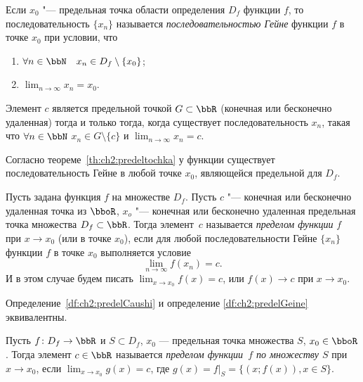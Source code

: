 \begin{defn}
Если $x_0$ "--- предельная точка области определения $D_f$ функции $f$, то последовательность $\{x_n\}$ называется \textit{последовательностью Гейне} функции $f$ в точке $x_0$ при условии, что
\begin{enumerate}
\item $\forall n \in \bbN\quad x_n\in D_f\setminus \{x_0\}$;
\item $\lim_{n \to \infty}\limits x_n = x_0$.
\end{enumerate}
\end{defn}

\begin{thm}
\label{th:ch2:predeltochka}
Элемент $c$ является предельной точкой $G\subset \bbR$ (конечная или бесконечно удаленная) тогда и только тогда, когда существует последовательность ${x_n}$, такая что $\forall n \in \bbN$ $x_n \in G\setminus\{c\}$ и $\lim_{n \to \infty}\limits x_n = c$. 
\end{thm}

Согласно теореме~\ref{th:ch2:predeltochka} у функции существует последовательность Гейне в любой точке $x_0$, являющейся предельной для $D_f$.

\begin{defn}\label{df:ch2:predelGeine}
Пусть задана функция $f$ на множестве $D_f$. Пусть $c$ "--- конечная или бесконечно удаленная точка из $\bboR$, $x_o$ "--- конечная или бесконечно удаленная предельная точка  множества $D_f \subset \bbR$. Тогда элемент~$c$ называется \textit{пределом функции} $f$ при $x \to x_0$ (или в точке $x_0$), если для любой последовательности Гейне $\{x_n\}$ функции $f$ в точке $x_0$ выполняется условие 
$$\lim_{n \to \infty}\limits f(x_n) = c.$$ 
И в этом случае будем писать $\lim_{x \to x_0}\limits f(x) = c$, или $f(x)\to c$ при $x \to x_0$.
\end{defn}

\begin{thm}
Определение~\ref{df:ch2:predelCaushi} и определение \ref{df:ch2:predelGeine} эквивалентны.
\end{thm}

\begin{defn}
Пусть $f\colon D_f \to \bbR$ и $S \subset D_f$, $x_0$ --- предельная точка множества $S$, $x_0 \in \bboR$. Тогда элемент $c \in \bbR$ называется \textit{пределом функции~$f$ по множеству $S$} при $x \to x_0$, если $\lim_{x \to x_0}\limits g(x) = c$, где $g(x)=\left.f\right|_S = \{(x;f(x)),x \in S\}$.
\end{defn}

